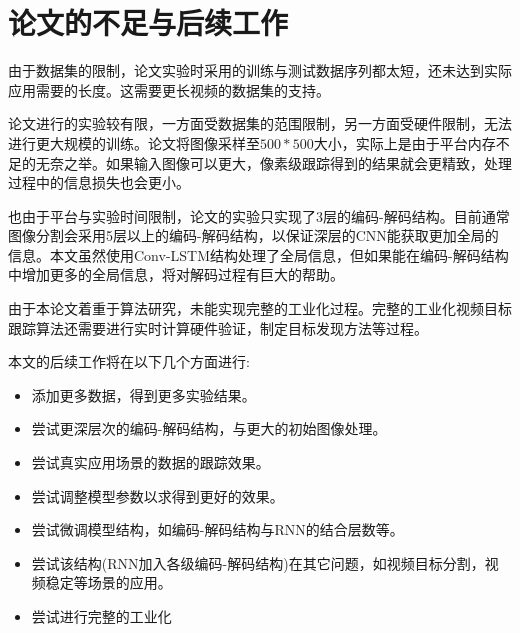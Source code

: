 \section{论文的不足与后续工作}
由于数据集的限制，论文实验时采用的训练与测试数据序列都太短，还未达到实际应用需要的长度。这需要更长视频的数据集的支持。
\par
论文进行的实验较有限，一方面受数据集的范围限制，另一方面受硬件限制，无法进行更大规模的训练。论文将图像采样至$500*500$大小，实际上是由于平台内存不足的无奈之举。如果输入图像可以更大，像素级跟踪得到的结果就会更精致，处理过程中的信息损失也会更小。
\par
也由于平台与实验时间限制，论文的实验只实现了3层的编码-解码结构。目前通常图像分割会采用5层以上的编码-解码结构，以保证深层的CNN能获取更加全局的信息。本文虽然使用Conv-LSTM结构处理了全局信息，但如果能在编码-解码结构中增加更多的全局信息，将对解码过程有巨大的帮助。
\par
由于本论文着重于算法研究，未能实现完整的工业化过程。完整的工业化视频目标跟踪算法还需要进行实时计算硬件验证，制定目标发现方法等过程。
\par
本文的后续工作将在以下几个方面进行:
\begin{itemize}
    \item 添加更多数据，得到更多实验结果。
    \item 尝试更深层次的编码-解码结构，与更大的初始图像处理。
    \item 尝试真实应用场景的数据的跟踪效果。
    \item 尝试调整模型参数以求得到更好的效果。
    \item 尝试微调模型结构，如编码-解码结构与RNN的结合层数等。
    \item 尝试该结构(RNN加入各级编码-解码结构)在其它问题，如视频目标分割，视频稳定等场景的应用。
    \item 尝试进行完整的工业化
\end{itemize}

